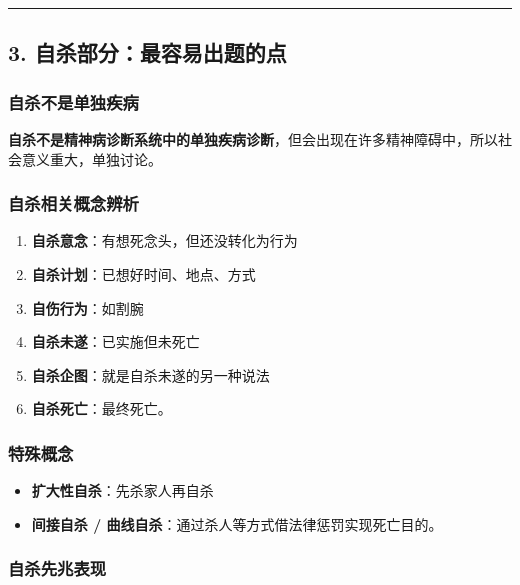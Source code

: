 \documentclass[
  a4paper,
]{ctexart}
\providecommand{\tightlist}{%
  \setlength{\itemsep}{0pt}\setlength{\parskip}{0pt}}
\begin{document}
\begin{center}\rule{0.5\linewidth}{0.5pt}\end{center}

\subsection{3.
自杀部分：最容易出题的点}\label{ux81eaux6740ux90e8ux5206ux6700ux5bb9ux6613ux51faux9898ux7684ux70b9}

\subsubsection{自杀不是单独疾病}\label{ux81eaux6740ux4e0dux662fux5355ux72ecux75beux75c5}

\textbf{自杀不是精神病诊断系统中的单独疾病诊断}，但会出现在许多精神障碍中，所以社会意义重大，单独讨论。

\subsubsection{自杀相关概念辨析}\label{ux81eaux6740ux76f8ux5173ux6982ux5ff5ux8fa8ux6790}

\begin{enumerate}
\def\labelenumi{\arabic{enumi}.}
\tightlist
\item
  \textbf{自杀意念}：有想死念头，但还没转化为行为
\item
  \textbf{自杀计划}：已想好时间、地点、方式
\item
  \textbf{自伤行为}：如割腕
\item
  \textbf{自杀未遂}：已实施但未死亡
\item
  \textbf{自杀企图}：就是自杀未遂的另一种说法
\item
  \textbf{自杀死亡}：最终死亡。
\end{enumerate}

\subsubsection{特殊概念}\label{ux7279ux6b8aux6982ux5ff5}

\begin{itemize}
\tightlist
\item
  \textbf{扩大性自杀}：先杀家人再自杀
\item
  \textbf{间接自杀 / 曲线自杀}：通过杀人等方式借法律惩罚实现死亡目的。
\end{itemize}

\subsubsection{自杀先兆表现}\label{ux81eaux6740ux5148ux5146ux8868ux73b0}
\end{document}

